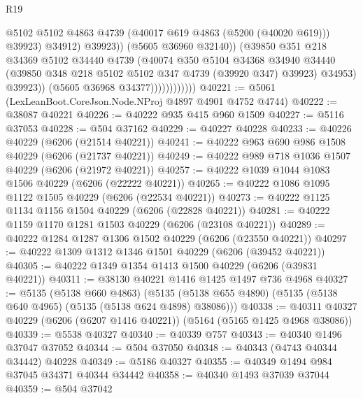 \begin{lexlean}{R19}
\begin{coremodule}
{{{{{{{{{{{                                      @5102
                                      @5102
                                      @4863
                                      @4739
                                      (@40017 @619 @4863 (@5200 (@40020 @619)))
                                      @39923)
                                    @34912)
                                  @39923))
                              (@5605 @36960 @32140))
                            (@39850
                              @351
                              @218
                              @34369
                              @5102
                              @34440
                              @4739
                              (@40074
                                @350
                                @5104
                                @34368
                                @34940
                                @34440
                                (@39850 @348 @218 @5102 @5102 @347 @4739 (@39920 @347) @39923)
                                @34953)
                              @39923))
                          (@5605 @36968 @34377))))))))))))
@40221 := @5061 (LexLeanBoot.CoreJson.Node.NProj @4897 @4901 @4752 @4744)
@40222 := @38087 @40221
@40226 := @40222 @935 @415 @960 @1509
@40227 := @5116 @37053
@40228 := @504 @37162
@40229 := @40227 @40228
@40233 := @40226 @40229 (@6206 (@21514 @40221))
@40241 := @40222 @963 @690 @986 @1508 @40229 (@6206 (@21737 @40221))
@40249 := @40222 @989 @718 @1036 @1507 @40229 (@6206 (@21972 @40221))
@40257 := @40222 @1039 @1044 @1083 @1506 @40229 (@6206 (@22222 @40221))
@40265 := @40222 @1086 @1095 @1122 @1505 @40229 (@6206 (@22534 @40221))
@40273 := @40222 @1125 @1134 @1156 @1504 @40229 (@6206 (@22828 @40221))
@40281 := @40222 @1159 @1170 @1281 @1503 @40229 (@6206 (@23108 @40221))
@40289 := @40222 @1284 @1287 @1306 @1502 @40229 (@6206 (@23550 @40221))
@40297 := @40222 @1309 @1312 @1346 @1501 @40229 (@6206 (@39452 @40221))
@40305 := @40222 @1349 @1354 @1413 @1500 @40229 (@6206 (@39831 @40221))
@40311 := @38130 @40221 @1416 @1425 @1497 @736 @4968
@40327 := @5135
    (@5138 @660 @4863)
    (@5135 (@5138 @655 @4890) (@5135 (@5138 @640 @4965) (@5135 (@5138 @624 @4898) @38086)))
@40338 := @40311 @40327 @40229 (@6206 (@6207 @1416 @40221)) (@5164 (@5165 @1425 @4968 @38086))
@40339 := @5538 @40327
@40340 := @40339 @757
@40343 := @40340 @1496 @37047 @37052
@40344 := @504 @37050
@40348 := @40343 (@4743 @40344 @34442) @40228
@40349 := @5186 @40327
@40355 := @40349 @1494 @984 @37045 @34371 @40344 @34442
@40358 := @40340 @1493 @37039 @37044
@40359 := @504 @37042
}}}}}}}}}}}
\end{coremodule}
\end{lexlean}

